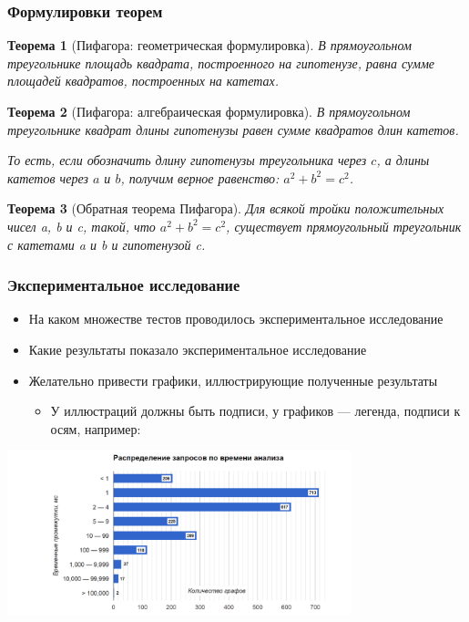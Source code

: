 \documentclass{beamer}
\newtheorem{rutheorem}{Теорема}
\begin{document}
\begin{frame}[fragile]
  \transwipe[direction=90]
  \frametitle{Формулировки теорем}
  \begin{rutheorem}[Пифагора: геометрическая формулировка]
    В прямоугольном треугольнике площадь квадрата, построенного на гипотенузе, равна сумме площадей квадратов, построенных на катетах.
  \end{rutheorem}

  \begin{rutheorem}[Пифагора: алгебраическая формулировка]
    В прямоугольном треугольнике квадрат длины гипотенузы равен сумме квадратов длин катетов.    

    То есть, если обозначить длину гипотенузы треугольника через $c$, а длины катетов 
через $a$ и $b$, получим верное равенство: $a^2 + b^2 = c^2$.
  \end{rutheorem}

  \begin{rutheorem}[Обратная теорема Пифагора]
    Для всякой тройки положительных чисел a, b и c, такой, что $a^2 + b^2 = c^2$, существует прямоугольный треугольник с катетами a и b и гипотенузой c.
  \end{rutheorem}  
\end{frame}

\begin{frame}[t]
  \transwipe[direction=90]
  \frametitle{Экспериментальное исследование}
  \begin{itemize}
    \item На каком множестве тестов проводилось экспериментальное исследование
    \item Какие результаты показало экспериментальное исследование
    \item Желательно привести графики, иллюстрирующие полученные результаты
    \begin{itemize}
      \item У иллюстраций должны быть подписи, у графиков --- легенда, подписи к осям, например:
    \end{itemize}
  \end{itemize}
  \includegraphics[width=10cm]{pictures/dist.png}
\end{frame}
\end{document}

